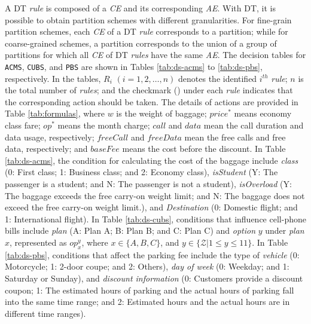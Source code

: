 \documentclass[10pt,journal,compsoc]{IEEEtran}
\begin{document}
A DT \emph{rule} is composed of a \emph{CE} and its corresponding \emph{AE}.
With DT, it is possible to obtain partition schemes with different granularities.
For fine-grain partition schemes, each \emph{CE} of a DT \emph{rule} corresponds to a partition;
while for coarse-grained schemes, a partition corresponds to the union of a group of partitions for which all \emph{CE} of DT \emph{rules} have the same \emph{AE}.
The decision tables for \texttt{ACMS}, \texttt{CUBS}, and \texttt{PBS} are shown in Tables \ref{tab:ds-acms} to \ref{tab:ds-pbs}, respectively. In the tables, $R_i$ $(i = 1, 2, \ldots, n)$ denotes the identified $i^{th}$ \emph{rule}; $n$ is the total number of \emph{rules}; and the checkmark (\checkmark) under each \emph{rule} indicates that the corresponding action should be taken.
The details of actions are provided in Table \ref{tab:formulas}, where $w$ is the weight of baggage; $price^*$ means economy class fare; $op^*$ means the month charge; $call$ and $data$ mean the call duration and data usage, respectively; $freeCall$ and $freeData$ mean the free calls and free data, respectively; and $baseFee$ means the cost before the discount. In Table \ref{tab:ds-acms}, the condition for calculating the cost of the baggage include \emph{class} (0: First class; 1: Business class; and 2: Economy class), \emph{isStudent} (Y: The passenger is a student; and N: The passenger is not a student), \emph{isOverload} (Y: The baggage exceeds the free carry-on weight limit; and N: The baggage does not exceed the free carry-on weight limit.), and \emph{Destination} (0: Domestic flight; and 1: International flight). In Table \ref{tab:ds-cubs}, conditions that influence cell-phone bills include \emph{plan} (A: Plan A; B: Plan B; and C: Plan C) and \emph{option} $y$ under \emph{plan} $x$, represented as $op_x^y$, where $x \in \{A, B, C\}$, and $y \in \{\mathcal{Z} |1 \le y \le 11\}$. In Table \ref{tab:ds-pbs}, conditions that affect the parking fee include the type of \emph{vehicle} (0: Motorcycle; 1: 2-door coupe; and 2: Others), \emph{day of week} (0: Weekday; and 1: Saturday or Sunday), and \emph{discount information} (0: Customers provide a discount coupon; 1: The estimated hours of parking and the actual hours of parking fall into the same time range; and 2: Estimated hours and the actual hours are in different time ranges).
\end{document}
